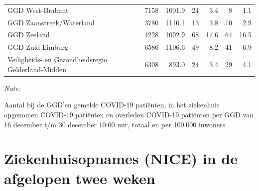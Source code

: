 \documentclass[
  english,
  man,floatsintext]{apa6}
\begin{document}
\begin{table}
\begin{threeparttable}
\begin{tabular}{lrrrrrr}
GGD West-Brabant & 7158 & 1001.9 & 24 & 3.4 & 8 & 1.1\\
GGD Zaanstreek/Waterland & 3780 & 1110.1 & 13 & 3.8 & 10 & 2.9\\
GGD Zeeland & 4228 & 1092.9 & 68 & 17.6 & 64 & 16.5\\
GGD Zuid-Limburg & 6586 & 1106.6 & 49 & 8.2 & 41 & 6.9\\
Veiligheids- en Gezondheidsregio Gelderland-Midden & 6308 & 893.0 & 24 & 3.4 & 29 & 4.1\\
\bottomrule
\end{tabular}
\begin{tablenotes}
\item \textit{Note: } 
\item Aantal bij de GGD’en gemelde COVID-19 patiënten, in het ziekenhuis opgenomen COVID-19 patiënten en overleden COVID-19 patiënten per GGD van 16 december t/m 30 december 10:00 uur, totaal en per 100.000 inwoners
\end{tablenotes}
\end{threeparttable}
\endgroup{}
\end{table}

\newpage

\hypertarget{ziekenhuisopnames-nice-in-de-afgelopen-twee-weken}{%
\section{Ziekenhuisopnames (NICE) in de afgelopen twee weken}\label{ziekenhuisopnames-nice-in-de-afgelopen-twee-weken}}
\end{document}
